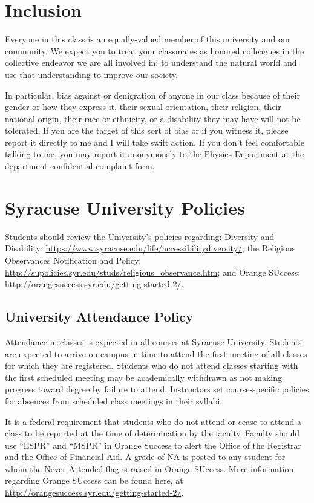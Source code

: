 \documentclass[12pt]{article}
\begin{document}
\section*{Inclusion}

Everyone in this class is an equally-valued member of this university and our community. We expect you to treat your classmates as honored colleagues in the collective endeavor we are all involved in: to understand the natural world and use that understanding to improve our society. 

In particular, bias against or denigration of anyone in our class because of their gender or how they express it, their sexual orientation, their religion, their national origin, their race or ethnicity, or a disability they may have will not be tolerated. If you are the target of this sort of bias or if you witness it, please report it directly to me and I will take swift action. If you don’t feel comfortable talking to me, you may report it anonymously to the Physics Department at 
\href{https://syracuseuniversity.qualtrics.com/jfe/form/SV_9pORpTKnq6pLeyF}{the department confidential complaint form}.

\newpage

\section*{Syracuse University Policies}
Students should review the University’s policies regarding: Diversity and Disability: \url{https://www.syracuse.edu/life/accessibilitydiversity/};  the Religious Observances Notification and Policy: \url{http://supolicies.syr.edu/studs/religious_observance.htm}; and Orange SUccess: \url{http://orangesuccess.syr.edu/getting-started-2/}.

\subsection*{University Attendance Policy}
Attendance in classes is expected in all courses at Syracuse University. Students are expected to arrive on campus in time to attend the first meeting of all classes for which they are registered. Students who do not attend classes starting with the first scheduled meeting may be academically withdrawn as not making progress toward degree by failure to attend. Instructors set course-specific policies for absences from scheduled class meetings in their syllabi.

It is a federal requirement that students who do not attend or cease to attend a class to be reported at the time of determination by the faculty. Faculty should use “ESPR” and “MSPR” in Orange Success to alert the Office of the Registrar and the Office of Financial Aid. A grade of NA is posted to any student for whom the Never Attended flag is raised in Orange SUccess. More information regarding Orange SUccess can be found here, at \url{http://orangesuccess.syr.edu/getting-started-2/}.
\end{document}
